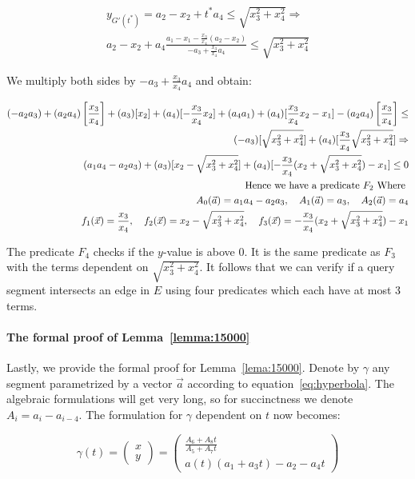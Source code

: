 \documentclass[UKenglish]{lipics-v2019}
\begin{document}
\begin{align*}
    y_{G'(t^*)} = a_2 - x_2 + t^* a_4   \le \sqrt{x_3^2 + x_4^2} \Rightarrow \\
    a_2 - x_2 + a_4 \frac{   a_1 - x_1 - \frac{x_3}{x_4} (a_2 - x_2)}{ - a_3 + \frac{x_3}{x_4}a_4} \le \sqrt{x_3^2 + x_4^2} 
\end{align*}

We multiply both sides by $- a_3 + \frac{x_3}{x_4}a_4$ and obtain:


\begin{align*}
    (- a_2 a_3) +  (a_2 a_4) \left[\frac{x_3}{x_4}\right] +  (a_3)[x_2] + (a_4)[ - \frac{x_3}{x_4}x_2] + (a_4 a_1) + (a_4)[ \frac{x_3}{x_4}x_2 - x_1] - (a_2a_4)\left[\frac{x_3}{x_4}\right]
        \le \\
    (- a_3)[ \sqrt{x_3^2 + x_4^2} ] + (a_4) [\frac{x_3}{x_4} \sqrt{x_3^2 + x_4^2}] \Rightarrow \\
    (a_1 a_4 - a_2 a_3) + (a_3)[x_2 - \sqrt{x_3^2 + x_4^2}] + (a_4)[ - \frac{x_3}{x_4}( x_2 + \sqrt{x_3^2 + x_4^2}) -x_1 ] \le 0 \\
    \textnormal{Hence we have a predicate } F_2 \textnormal{ Where } \\
    A_0(\vec{a}) = a_1 a_4 - a_2 a_3, \quad A_1(\vec{a}) = a_3, \quad A_2(\vec{a}) = a_4 \\
   f_1(\vec{x}) = \frac{x_3}{x_4}, \quad f_2(\vec{x}) =  x_2 - \sqrt{x_3^2 + x_4^2}, \quad f_3(\vec{x}) = - \frac{x_3}{x_4}( x_2 + \sqrt{x_3^2 + x_4^2}) -x_1
\end{align*}

The predicate $F_4$ checks if the $y$-value is above $0$. It is the same predicate as $F_3$ with the terms dependent on $\sqrt{x_3^2 + x_4^2}$. It follows that we can verify if a query segment intersects an edge in $E$ using four predicates which each have at most 3 terms. 

\paragraph*{The formal proof of Lemma~\ref{lemma:15000}}

Lastly, we provide the formal proof for Lemma~\ref{lema:15000}. Denote by $\gamma$ any segment parametrized by a vector $\vec{a}$ according to equation~\ref{eq:hyperbola}. The algebraic formulations will get very long, so for succinctness we denote $A_i = a_i - a_{i-4}$. The formulation for $\gamma$ dependent on $t$ now becomes:

\begin{equation}
  \gamma(t) = \left( \begin{array}{c}
         x  \\
         y 
    \end{array}  \right) =  
        \left( \begin{array}{c}
         \frac{ A_6 + A_8 t}
      { A_5  + A_7 t } \\
         a(t)(a_1 +  a_3 t) - a_2 -  a_4 t 
    \end{array}  \right)
\end{equation}
\end{document}
